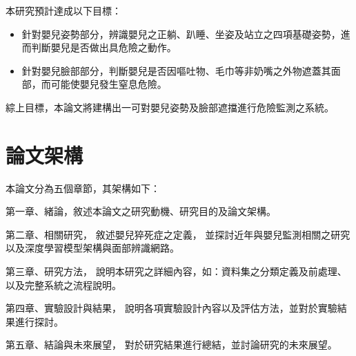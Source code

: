 \documentclass[class=NCU_thesis, crop=false]{standalone}
\begin{document}
本研究預計達成以下目標：
\begin{itemize}
    \item 針對嬰兒姿勢部分，辨識嬰兒之正躺、趴睡、坐姿及站立之四項基礎姿勢，進而判斷嬰兒是否做出具危險之動作。
    \item 針對嬰兒臉部部分，判斷嬰兒是否因嘔吐物、毛巾等非奶嘴之外物遮蓋其面部，而可能使嬰兒發生窒息危險。
\end{itemize}

綜上目標，本論文將建構出一可對嬰兒姿勢及臉部遮擋進行危險監測之系統。

\section{論文架構}
本論文分為五個章節，其架構如下：

第一章、緒論，敘述本論文之研究動機、研究目的及論文架構。

第二章、相關研究，
敘述嬰兒猝死症之定義，
並探討近年與嬰兒監測相關之研究以及深度學習模型架構與面部辨識網路。

第三章、研究方法，
說明本研究之詳細內容，如：資料集之分類定義及前處理、以及完整系統之流程說明。

第四章、實驗設計與結果，
說明各項實驗設計內容以及評估方法，並對於實驗結果進行探討。

第五章、結論與未來展望，
對於研究結果進行總結，並討論研究的未來展望。
\end{document}
